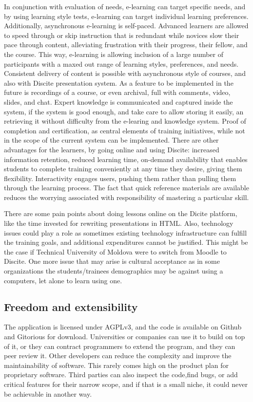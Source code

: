 In conjunction with evaluation of needs, e-learning can target specific needs,
and by using learning style tests, e-learning can  target individual learning
preferences.  Additionally, asynchronous e-learning is self-paced. Advanced
learners are allowed to speed through or skip instruction that is redundant
while novices slow their pace through content, alleviating frustration with
their progress, their fellow, and the course.  This way, e-learning is allowing
inclusion of a large number of participants with a maxed out range of learning
styles, preferences, and needs.  Consistent delivery of content is possible with
asynchronous style of courses, and also with Discite presentation system. As a
feature to be implemented in the future is recordings of a course, or even
archival, full with comments, video, slides, and chat.  Expert knowledge is
communicated and captured inside the system, if the system is good enough, and
take care to allow storing it easily, an retrieving it without difficulty from
the e-learing and knowledge system.  Proof of completion and certification, as
central elements of training initiatives, while not in the scope of the current
system can be implemented.  There are other advantages for the learners, by
going online and using Discite: increased information retention, reduced
learning time, on-demand availability that enables students to complete training
conveniently at any time they desire, giving them flexibility.  Interactivity
engages users, pushing them rather than pulling them through the learning
process. The fact that quick reference materials are available reduces the
worrying associated with responsibility of mastering a particular skill.

There are some pain points about doing lessons online on the Dicite
platform, like the time invested for rewriting presentations in HTML.
Also, technology issues could play a role as sometimes existing technology
infrastructure can fulfill the training goals, and additional
expenditures cannot be justified. This might be the case if Technical University of Moldova
 were to switch from Moodle to Discite. One more issue that may arise is
 cultural acceptance as in some organizations the students/trainees demographics may be
 against using a computers, let alone to learn using one.
\subsection{Freedom and extensibility} The application is licensed under AGPLv3,
and the code is available on Github and Gitorious for download. Universities or
companies can use it to build on top of it, or they can contract programmers to
extend the program, and they can peer review it. Other developers can reduce the
complexity and improve the maintainability of software. This rarely comes high
on the product plan for proprietary software. Third parties can also inspect the
code,find bugs, or add critical features for their narrow scope, and if that is
a small niche, it could never be achievable in another way.

